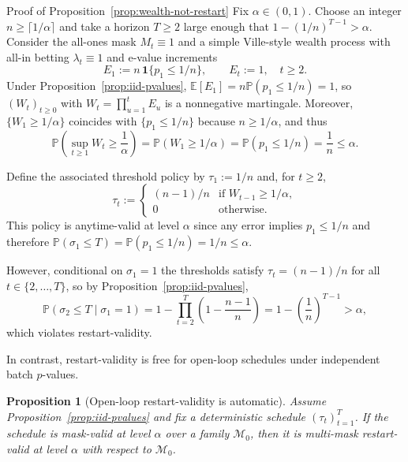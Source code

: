 \documentclass{uai2026} %
\newtheorem{proposition}[theorem]{Proposition}
\newcommand{\1}{\mathbf{1}}
\newcommand{\ind}[1]{\mathbf{1}\{#1\}}
\newcommand{\prob}{\mathbb{P}}
\newcommand{\expec}{\mathbb{E}}
\newcommand{\mcal}{\mathcal{M}}
\begin{document}
\begin{appendixproof}{Proof of Proposition~\ref{prop:wealth-not-restart}}
  Fix $\alpha\in(0,1)$.
  Choose an integer $n\ge \lceil 1/\alpha\rceil$ and take a horizon $T\ge 2$ large enough that $1-(1/n)^{T-1}>\alpha$.
  Consider the all-ones mask $M_t\equiv 1$ and a simple Ville-style wealth process with all-in betting $\lambda_t\equiv 1$ and e-value increments
  \begin{equation*}
    E_1 := n\,\ind{p_1\le 1/n},
    \qquad
    E_t := 1,\quad t\ge 2.
  \end{equation*}
  Under Proposition~\ref{prop:iid-pvalues}, $\expec[E_1]=n\prob(p_1\le 1/n)=1$, so $(W_t)_{t\ge 0}$ with $W_t=\prod_{u=1}^{t}E_u$ is a nonnegative martingale.
  Moreover, $\{W_1\ge 1/\alpha\}$ coincides with $\{p_1\le 1/n\}$ because $n\ge 1/\alpha$, and thus
  \begin{equation*}
    \prob\left(\sup_{t\ge 1} W_t \ge \frac{1}{\alpha}\right)
    =
    \prob(W_1\ge 1/\alpha)
    =
    \prob(p_1\le 1/n)
    =
    \frac{1}{n}
    \le \alpha.
  \end{equation*}

  Define the associated threshold policy by $\tau_1:=1/n$ and, for $t\ge 2$,
  \begin{equation*}
    \tau_t :=
    \begin{cases}
      (n-1)/n & \text{if } W_{t-1}\ge 1/\alpha,\\
      0 & \text{otherwise.}
    \end{cases}
  \end{equation*}
  This policy is anytime-valid at level $\alpha$ since any error implies $p_1\le 1/n$ and therefore
  $\prob(\sigma_1\le T)=\prob(p_1\le 1/n)=1/n\le \alpha$.

  However, conditional on $\sigma_1=1$ the thresholds satisfy $\tau_t=(n-1)/n$ for all $t\in\{2,\dots,T\}$, so by Proposition~\ref{prop:iid-pvalues},
  \begin{equation*}
    \prob(\sigma_2\le T\mid \sigma_1=1)
    =
    1-\prod_{t=2}^{T}\left(1-\frac{n-1}{n}\right)
    =
    1-\left(\frac{1}{n}\right)^{T-1}
    >
    \alpha,
  \end{equation*}
  which violates restart-validity.
\end{appendixproof}

In contrast, restart-validity is free for open-loop schedules under independent batch $p$-values.

\begin{proposition}[Open-loop restart-validity is automatic]
  \label{prop:open-loop-restart}
  Assume Proposition~\ref{prop:iid-pvalues} and fix a deterministic schedule $(\tau_t)_{t=1}^T$.
  If the schedule is mask-valid at level $\alpha$ over a family $\mcal_0$, then it is multi-mask restart-valid at level $\alpha$ with respect to $\mcal_0$.
\end{proposition}
\end{document}
